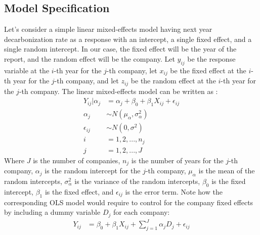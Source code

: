 \subsection{Model Specification}
Let's consider a simple linear mixed-effects model having next year decarbonization rate as a response with an intercept, a single fixed effect, and a single random intercept. In our case, the fixed effect will be the year of the report, and the random effect will be the company. Let $y_{ij}$ be the response variable at the $i$-th year for the $j$-th company, let $x_{ij}$ be the fixed effect at the $i$-th year for the $j$-th company, and let $z_{ij}$ be the random effect at the $i$-th year for the $j$-th company. The linear mixed-effects model can be written as \cite{duke_sta216_lecture}:
\begin{align}
    Y_{ij}| \alpha_j &= \alpha_j + \beta_0 + \beta_1 X_{ij} + \epsilon_{ij} \\
    \alpha_j &\sim N(\mu_{\alpha}, \sigma^2_{\alpha}) \\
    \epsilon_{ij} &\sim N(0, \sigma^2) \\
    i &= 1, 2, ..., n_j \\
    j &= 1, 2, ..., J
\end{align}
Where $J$ is the number of companies, $n_j$ is the number of years for the $j$-th company, $\alpha_j$ is the random intercept for the $j$-th company, $\mu_{\alpha}$ is the mean of the random intercepts, $\sigma^2_{\alpha}$ is the variance of the random intercepts, $\beta_0$ is the fixed intercept, $\beta_1$ is the fixed effect, and $\epsilon_{ij}$ is the error term. Note how the corresponding OLS model would require to control for the company fixed effects by including a dummy variable $D_j$ for each company:
\begin{align}
    Y_{ij} &= \beta_0 + \beta_1 X_{ij} + \sum_{j=1}^{J} \alpha_j D_j + \epsilon_{ij}
\end{align}
